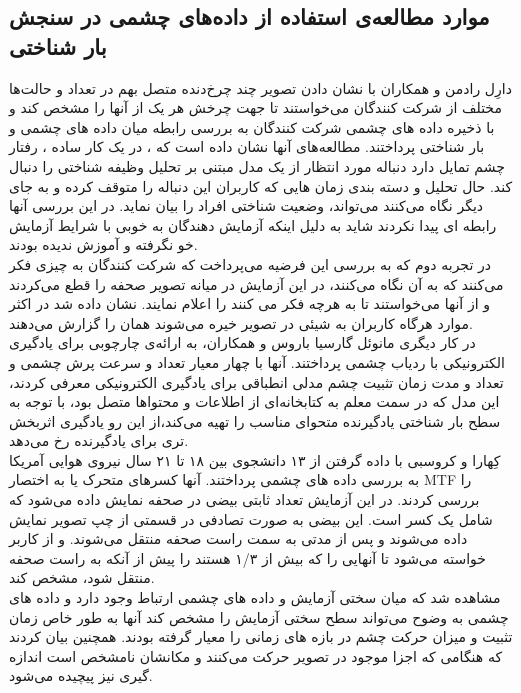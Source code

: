 \subsection{موارد مطالعه‌ی استفاده از داده‌های چشمی در سنجش بار شناختی}
دارِل رادمن و همکاران
\cite{Rudmann2003}
با نشان دادن تصویر چند چرخ‌دنده متصل بهم در تعداد و حالت‌ها مختلف از شرکت کنندگان می‌خواستند تا جهت چرخش هر یک از آنها را مشخص کند و با ذخیره داده های چشمی شرکت کنندگان به بررسی رابطه میان داده های چشمی و بار شناختی پرداختند. مطالعه‌های آنها نشان داده است که ، در یک کار ساده ، رفتار چشم تمایل دارد دنباله مورد انتظار از یک مدل مبتنی بر تحلیل وظیفه شناختی را دنبال کند. حال تحلیل و دسته بندی زمان هایی که کاربران این دنباله را متوقف کرده و به جای دیگر نگاه می‌کنند می‌تواند، وضعیت شناختی افراد را بیان نماید. در این بررسی آنها رابطه ای پیدا نکردند شاید به دلیل اینکه آزمایش دهندگان به خوبی با شرایط آزمایش خو نگرفته و آموزش ندیده بودند.
\\
در تجربه دوم که به بررسی این فرضیه می‌پرداخت که شرکت کنندگان به چیزی فکر می‌کنند که به آن نگاه می‌کنند، در این آزمایش در میانه تصویر صحفه را قطع می‌کردند و از آنها می‌خواستند تا به هرچه فکر می کنند را اعلام نمایند. نشان داده شد در اکثر موارد هرگاه کاربران به شیئی در تصویر خیره می‌شوند همان را گزارش می‌دهند.
\\
در کار دیگری مانوئل گارسیا باروس و همکاران،
\cite{Garcia-Barrios2004}
به ارائه‌ی چارچوبی برای یادگیری الکترونیکی با ردیاب چشمی پرداختند. آنها با چهار معیار تعداد و سرعت پرش چشمی و تعداد و مدت زمان تثبیت چشم مدلی انطباقی برای یادگیری الکترونیکی معرفی کردند، این مدل که در سمت معلم به کتابخانه‌ای از اطلاعات و محتواها متصل بود، با توجه به سطح بار شناختی یادگیرنده متحوای مناسب را تهیه می‌کند،‌از این رو یادگیری اثربخش تری برای یادگیرنده رخ می‌دهد.
\\
کِهارا و کروسبی
\cite{Ikehara2005}
با داده گرفتن از ۱۳ دانشجوی بین ۱۸ تا ۲۱ سال نیروی هوایی آمریکا به بررسی داده های چشمی پرداختند.
آنها کسرهای متحرک یا به اختصار MTF
را بررسی کردند. در این آزمایش تعداد ثابتی بیضی در صحفه نمایش داده می‌شود که شامل یک کسر است. این بیضی به صورت تصادفی در قسمتی از چپ تصویر نمایش داده می‌شوند و پس از مدتی به سمت راست صحفه منتقل می‌شوند. و از کاربر خواسته می‌شود تا آنهایی را که بیش از ۱/۳ هستند را پیش از آنکه به راست صحفه منتقل شود، مشخص کند.
\\
مشاهده شد که میان سختی آزمایش و داده های چشمی ارتباط وجود دارد و داده های چشمی به وضوح می‌تواند سطح سختی آزمایش را مشخص کند آنها به طور خاص زمان تثبیت و میزان حرکت چشم در بازه های زمانی را معیار گرفته بودند. همچنین بیان کردند که هنگامی که اجزا موجود در تصویر حرکت می‌کنند و مکانشان نامشخص است اندازه گیری نیز پیچیده می‌شود.
